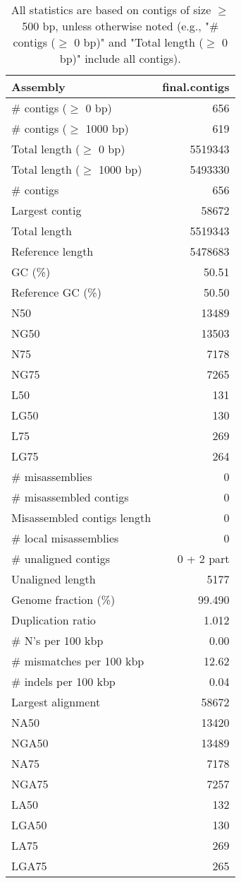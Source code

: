 \documentclass[12pt,a4paper]{article}
\begin{document}
\begin{table}[ht]
\begin{center}
\caption{All statistics are based on contigs of size $\geq$ 500 bp, unless otherwise noted (e.g., "\# contigs ($\geq$ 0 bp)" and "Total length ($\geq$ 0 bp)" include all contigs).}
\begin{tabular}{|l*{1}{|r}|}
\hline
Assembly & final.contigs \\ \hline
\# contigs ($\geq$ 0 bp) & 656 \\ \hline
\# contigs ($\geq$ 1000 bp) & 619 \\ \hline
Total length ($\geq$ 0 bp) & 5519343 \\ \hline
Total length ($\geq$ 1000 bp) & 5493330 \\ \hline
\# contigs & 656 \\ \hline
Largest contig & 58672 \\ \hline
Total length & 5519343 \\ \hline
Reference length & 5478683 \\ \hline
GC (\%) & 50.51 \\ \hline
Reference GC (\%) & 50.50 \\ \hline
N50 & 13489 \\ \hline
NG50 & 13503 \\ \hline
N75 & 7178 \\ \hline
NG75 & 7265 \\ \hline
L50 & 131 \\ \hline
LG50 & 130 \\ \hline
L75 & 269 \\ \hline
LG75 & 264 \\ \hline
\# misassemblies & 0 \\ \hline
\# misassembled contigs & 0 \\ \hline
Misassembled contigs length & 0 \\ \hline
\# local misassemblies & 0 \\ \hline
\# unaligned contigs & 0 + 2 part \\ \hline
Unaligned length & 5177 \\ \hline
Genome fraction (\%) & 99.490 \\ \hline
Duplication ratio & 1.012 \\ \hline
\# N's per 100 kbp & 0.00 \\ \hline
\# mismatches per 100 kbp & 12.62 \\ \hline
\# indels per 100 kbp & 0.04 \\ \hline
Largest alignment & 58672 \\ \hline
NA50 & 13420 \\ \hline
NGA50 & 13489 \\ \hline
NA75 & 7178 \\ \hline
NGA75 & 7257 \\ \hline
LA50 & 132 \\ \hline
LGA50 & 130 \\ \hline
LA75 & 269 \\ \hline
LGA75 & 265 \\ \hline
\end{tabular}
\end{center}
\end{table}
\end{document}
